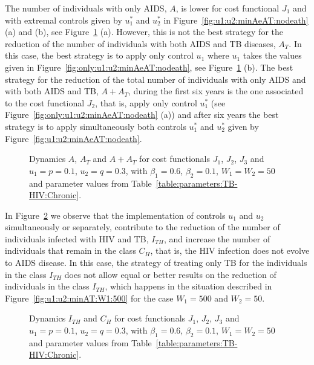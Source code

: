 \documentclass{my_aims}
\theoremstyle{definition}
\begin{document}
The number of individuals with only AIDS, $A$, is lower for cost functional $J_1$
and with extremal controls given by $u_1^*$ and $u_2^*$ in
Figure~\ref{fig:u1:u2:minAeAT:nodeath} (a) and (b), see Figure~\ref{fig:A:AT:minAeAT:nodeath} (a).
However, this is not the best strategy for the reduction of the number of individuals
with both AIDS and TB diseases, $A_T$. In this case, the best strategy is to apply only control
$u_1$ where $u_1$ takes the values given in Figure~\ref{fig:only:u1:u2:minAeAT:nodeath},
see Figure~\ref{fig:A:AT:minAeAT:nodeath} (b). The best strategy for the reduction of the
total number of individuals with only AIDS and with both AIDS and TB, $A + A_T$,
during the first six years is the one associated to the cost functional $J_2$, that is,
apply only control $u_1^*$ (see Figure~\ref{fig:only:u1:u2:minAeAT:nodeath} (a)) and
after six years the best strategy is to apply simultaneously both controls $u_1^*$
and $u_2^*$ given by Figure~\ref{fig:u1:u2:minAeAT:nodeath}.
\begin{figure}[!htb]
\centering
{}
\caption{Dynamics $A$, $A_T$ and $A + A_T$ for cost functionals $J_1$,
$J_2$, $J_3$ and $u_1=p=0.1$, $u_2 = q = 0.3$, with $\beta_1 = 0.6$, $\beta_2 = 0.1$,
$W_1 = W_2 = 50$ and parameter values from Table~\ref{table:parameters:TB-HIV:Chronic}.}
\label{fig:A:AT:minAeAT:nodeath}
\end{figure}
In Figure~\ref{fig:ITH:CH:minAeAT:nodeath} we observe that the implementation of controls
$u_1$ and $u_2$ simultaneously or separately, contribute to the reduction of the number of
individuals infected with HIV and TB, $I_{TH}$, and increase the number of individuals
that remain in the class $C_H$, that is, the HIV infection does not evolve to AIDS disease.
In this case, the strategy of treating only TB for the individuals in the class $I_{TH}$
does not allow equal or better results on the reduction of individuals in the class $I_{TH}$,
which happens in the situation described in Figure~\ref{fig:u1:u2:minAT:W1:500}
for the case $W_1 = 500$ and $W_2 = 50$.
\begin{figure}[!htb]
\centering
{}
\caption{Dynamics $I_{TH}$ and $C_H$ for cost functionals $J_1$, $J_2$, $J_3$
and $u_1=p=0.1$, $u_2 = q = 0.3$,
with $\beta_1 = 0.6$, $\beta_2 = 0.1$, $W_1 = W_2 = 50$ and parameter
values from Table~\ref{table:parameters:TB-HIV:Chronic}.}
\label{fig:ITH:CH:minAeAT:nodeath}
\end{figure}
\end{document}
